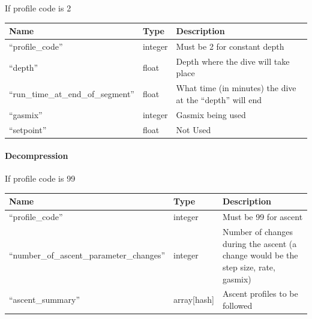 \documentclass[12pt]{article}
\begin{document}
If profile code is 2

\begin{longtable}{|l|l|p{5cm}|}
\hline
 Name                                 &  Type     &  Description                                                \\
\hline
 ``profile\_code''                    &  integer  &  Must be 2 for constant depth                               \\
\hline
 ``depth''                            &  float    &  Depth where the dive will take place                       \\
\hline
 ``run\_time\_at\_end\_of\_segment''  &  float    &  What time (in minutes) the dive at the ``depth'' will end  \\
\hline
 ``gasmix''                           &  integer  &  Gasmix being used                                          \\
\hline
 ``setpoint''                         &  float    &  Not Used                                                    \\
\hline
\end{longtable}

\paragraph{Decompression}

If profile code is 99

\begin{longtable}{|l|l|p{5cm}|}
\hline
 Name                                        &  Type         &  Description                                                                          \\
\hline
 ``profile\_code''                           &  integer      &  Must be 99 for ascent                                                                \\
\hline
 ``number\_of\_ascent\_parameter\_changes''  &  integer      &  Number of changes during the ascent (a change would be the step size, rate, gasmix)  \\
\hline
 ``ascent\_summary''                         &  array[hash]  &  Ascent profiles to be followed                                                       \\
\hline
\end{longtable}
\end{document}
